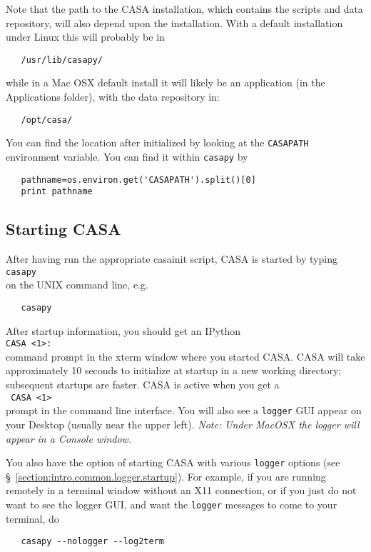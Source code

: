Note that the path to the CASA installation, which contains
the scripts and data repository, will also depend upon the 
installation.  With a default installation under Linux this
will probably be in
\small
\begin{verbatim}
   /usr/lib/casapy/
\end{verbatim}
\normalsize
while in a Mac OSX default install it will likely be an 
application (in the Applications folder), with the data
repository in:
\small
\begin{verbatim}
   /opt/casa/
\end{verbatim}
\normalsize

You can find the location after initialized by looking at
the {\tt CASAPATH} environment variable.  You can find
it within {\tt casapy} by
\small
\begin{verbatim}
   pathname=os.environ.get('CASAPATH').split()[0]
   print pathname
\end{verbatim}
\normalsize

\subsection{Starting CASA}
\label{section:intro.basics.starting}

After having run the appropriate casainit script, CASA is started by
typing\\ {\tt casapy}\\ on the UNIX command line, e.g.
\small
\begin{verbatim}
   casapy
\end{verbatim}
\normalsize
After startup information,
you should get an IPython\\ {\tt CASA <1>:}\\ command prompt in the
xterm window where you started CASA. CASA will take approximately 10
seconds to initialize at startup in a new working directory;
subsequent startups are faster.  CASA is active when you get a\\ {\tt
CASA <1>}\\ prompt in the command line interface.  You will also
see a {\tt logger} GUI appear on your Desktop (usually near the
upper left).  {\em Note: Under MacOSX the logger will appear in a
Console window.}

You also have the option of starting CASA with various {\tt logger}
options (see \S~\ref{section:intro.common.logger.startup}).  For
example, if you are running remotely in a terminal window without
an X11 connection, or if you just do not want to see the logger GUI,
and want the {\tt logger} messages to come to your terminal, do
\small
\begin{verbatim}
   casapy --nologger --log2term
\end{verbatim}
\normalsize


